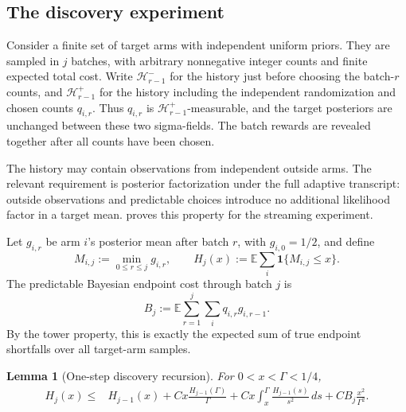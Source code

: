 \documentclass[11pt,letterpaper]{article}
\numberwithin{equation}{section}
\newtheorem{lemma}[lemma]{Lemma}
\theoremstyle{definition}
\theoremstyle{remark}
\newcommand{\E}{\mathbb{E}}
\newcommand{\1}{\mathbf{1}}
\newcommand{\Hh}{\mathcal{H}}
\begin{document}
\subsection{The discovery experiment}

Consider a finite set of target arms with independent uniform priors.
They are sampled in $j$ batches, with arbitrary nonnegative integer
counts and finite expected total cost. Write $\Hh_{r-1}^{-}$ for the
history just before choosing the batch-$r$ counts, and
$\Hh_{r-1}^{+}$ for the history including the independent randomization
and chosen counts $q_{i,r}$. Thus $q_{i,r}$ is
$\Hh_{r-1}^{+}$-measurable, and the target posteriors are unchanged
between these two sigma-fields. The batch rewards are revealed together
after all counts have been chosen.

The history may contain observations from independent outside arms.
The relevant requirement is posterior factorization under the full
adaptive transcript: outside observations and predictable choices
introduce no additional likelihood factor in a target mean.
 proves this property for the streaming experiment.

Let $g_{i,r}$ be arm $i$'s posterior mean after batch $r$, with
$g_{i,0}=1/2$, and define
\[
  M_{i,j}:=\min_{0\le r\le j}g_{i,r},
  \qquad
  H_j(x):=\E\sum_i\1\{M_{i,j}\le x\}.
\]
The predictable Bayesian endpoint cost through batch $j$ is
\begin{equation}\label{eq:Bj}
  B_j:=\E\sum_{r=1}^{j}\sum_i q_{i,r}g_{i,r-1}.
\end{equation}
By the tower property, this is exactly the expected sum of true endpoint
shortfalls over all target-arm samples.

\begin{lemma}[One-step discovery recursion]\label{lem:discovery-recursion}
For $0<x<\Gamma<1/4$,
\begin{align}
  H_j(x)
  \le{}&H_{j-1}(x)
  +Cx\frac{H_{j-1}(\Gamma)}{\Gamma}
  +Cx\int_x^\Gamma\frac{H_{j-1}(s)}{s^2}\,ds
  +CB_j\frac{x^2}{\Gamma^2}.                 \label{eq:discovery-recursion}
\end{align}
\end{lemma}
\end{document}
